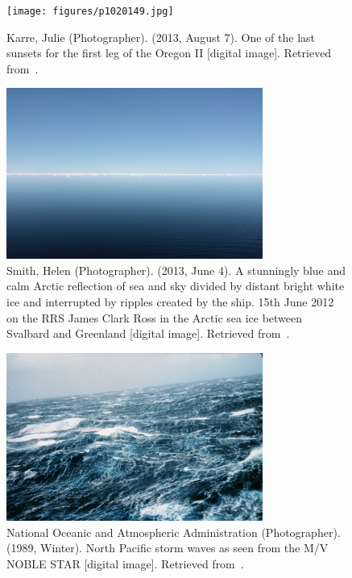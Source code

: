%
\begin{figure}[p]
\centering
\texttt{[image: figures/p1020149.jpg]}
\caption{
	Karre, Julie (Photographer).
	(2013, August 7).
	One of the last sunsets for the first leg of the Oregon II [digital image].
	Retrieved from~\citet{misc:noaa:sunset}.
	}
\label{fig:ocean:sunset}
\end{figure}
\begin{figure}[p]
\centering
\includegraphics[width=0.75\textwidth]{figures/helen-smith-arcticsea.jpg}
\caption{
	Smith, Helen (Photographer).
	(2013, June 4).
	A stunningly blue and calm Arctic reflection of sea and sky divided by distant
	bright white ice and interrupted by ripples created by the ship. 15th June
	2012 on the RRS James Clark Ross in the Arctic sea ice between Svalbard and
	Greenland [digital image].
	Retrieved from~\citet{misc:noaa:arctic}.
	}
\end{figure}
\begin{figure}
\centering
\includegraphics[width=0.75\textwidth]{figures/wea00816.jpg}
\caption{
	National Oceanic and Atmospheric Administration (Photographer).
	(1989, Winter).
	North Pacific storm waves as seen from the M/V NOBLE STAR [digital image].
	Retrieved from~\citet{misc:noaa:storm}.
	}
\end{figure}
%
%
